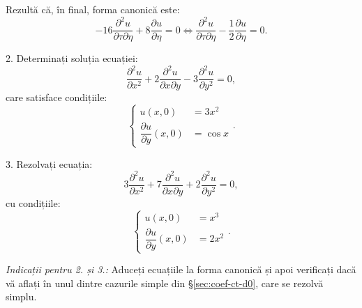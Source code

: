 \newpage

Rezultă că, în final, forma canonică este:
\[
  -16 \dfrac{\partial^2 u}{\partial \tau \partial \eta} + 8 \dfrac{\partial u}{\partial \eta} = 0 %
  \Leftrightarrow \dfrac{\partial^2 u}{\partial \tau \partial \eta} - %
  \dfrac{1}{2} \dfrac{\partial u}{\partial \eta} = 0.
\]

\vspace{0.3cm}

2. Determinați soluția ecuației:
\[
  \dfrac{\partial^2 u}{\partial x^2} + 2 \dfrac{\partial^2 u}{\partial x \partial y} - %
  3 \dfrac{\partial^2 u}{\partial y^2} = 0,
\]
care satisface condițiile:
\[
  \begin{cases}
    u(x, 0) &= 3x^2 \\
    \dfrac{\partial u}{\partial y}(x, 0) &= \cos x
  \end{cases}.
\]

\vspace{0.3cm}

3. Rezolvați ecuația:
\[
  3 \dfrac{\partial^2 u}{\partial x^2} + 7 \dfrac{\partial^2 u}{\partial x\partial y} + %
  2 \dfrac{\partial^2 u}{\partial y^2} = 0,
\]
cu condițiile:
\[
  \begin{cases}
    u(x, 0) &= x^3 \\
    \dfrac{\partial u}{\partial y}(x, 0) &= 2x^2
  \end{cases}.
\]

\textit{Indicații pentru 2. și 3.:} Aduceți ecuațiile la forma canonică și
apoi verificați dacă vă aflați în unul dintre cazurile simple din
\S\ref{sec:coef-ct-d0}, care se rezolvă simplu.




